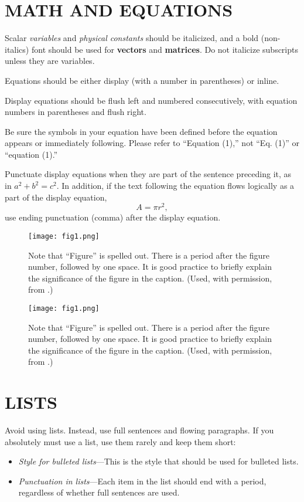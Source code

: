 \documentclass{IEEEmce}
\begin{document}
\section{MATH AND EQUATIONS}

Scalar {\it variables} and {\it physical constants} should be italicized, and a bold (non-italics) font should be used for {\bf vectors} and {\bf matrices}. Do not italicize subscripts unless they are variables.

Equations should be either display (with a number in parentheses) or inline. 

Display equations should be flush left and numbered consecutively, with equation numbers in parentheses and flush right.

Be sure the symbols in your equation have been defined before the equation appears or immediately following. Please refer to ``Equation (1),'' not ``Eq. (1)'' or ``equation (1).''

Punctuate display equations when they are part of the sentence preceding it, as in $a^2+b^2=c^2$. In addition, if the text following the equation flows logically as a part of the display equation, 
\begin{equation}
A=\pi r^2,
\end{equation}
use ending punctuation (comma) after the display equation.

\begin{figure}[b]
\vspace*{-10pt}
\centerline{\texttt{[image: fig1.png]}}
\caption{Note that ``Figure'' is spelled out. There is a period after the figure number, followed by one space. It is good practice to briefly explain the significance of the figure in the caption. (Used, with permission, from \cite{AA1}.)}
\end{figure}

\begin{figure*}
\centerline{\texttt{[image: fig1.png]}}
\caption{Note that ``Figure'' is spelled out. There is a period after the figure number, followed by one space. It is good practice to briefly explain the significance of the figure in the caption. (Used, with permission, from \cite{BB1}.)}
\end{figure*}

\section{LISTS}

Avoid using lists. Instead, use full sentences and flowing paragraphs. If you absolutely must use a list, use them rarely and keep them short:
\begin{itemize}
\item {\it Style for bulleted lists}---This is the style that should be used for bulleted lists.
	
\item {\it Punctuation in lists}---Each item in the list should end with a period, regardless of whether full sentences are used.
\end{itemize}
\end{document}
